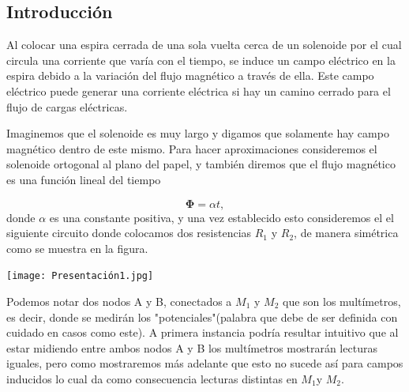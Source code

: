 \documentclass[a0,portrait]{a0poster}
\begin{document}
\begin{multicols}{2}



\color{black} %

\section*{Introducción}
\noindent Al colocar una espira cerrada de una sola vuelta cerca de un solenoide por el cual circula una corriente que varía con el tiempo, se induce un campo eléctrico en la espira debido a la variación del flujo magnético a través de ella. Este campo eléctrico puede generar una corriente eléctrica si hay un camino cerrado para el flujo de cargas eléctricas.

\noindent Imaginemos que el solenoide es muy largo y digamos que solamente hay campo magnético dentro de este mismo. Para hacer aproximaciones consideremos el solenoide ortogonal al plano del papel, y también diremos que el flujo magnético es una función lineal del tiempo

\begin{equation}
\boldsymbol{\Phi}=\alpha t,
\label{flujo}
\end{equation}
donde $\alpha$ es una constante positiva, y una vez establecido esto consideremos el el siguiente circuito donde colocamos dos resistencias $R_1$  y $R_2$, de manera simétrica como se muestra en la figura.

\begin{center}\vspace{0.4cm}
    \texttt{[image: Presentación1.jpg]}
\end{center}\vspace{0.4cm}
Podemos notar dos nodos A y B, conectados a $M_{1}$ y $M_{2}$ que son los multímetros, es decir, donde se medirán los "potenciales"(palabra que debe de ser definida con cuidado en casos como este). A primera instancia podría resultar intuitivo que al estar midiendo entre ambos nodos A y B los multímetros mostrarán lecturas iguales, pero como  mostraremos más adelante que esto no sucede así para campos inducidos lo cual da como consecuencia lecturas distintas en $M_{1}$y $M_{2}$.


\end{multicols}
\end{document}
